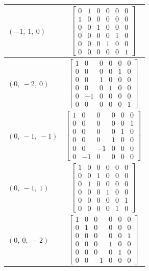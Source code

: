 \documentclass[11pt]{article}
\theoremstyle{definition}
\begin{document}
\begin{longtable}{|l|c|}
    \hline
    $\left( -1, \  1, \  0\right)$ & ${\left[\begin{matrix}0 & 1 & 0 & 0 & 0 & 0\\1 & 0 & 0 & 0 & 0 & 0\\0 & 0 & 1 & 0 & 0 & 0\\0 & 0 & 0 & 0 & 1 & 0\\0 & 0 & 0 & 1 & 0 & 0\\0 & 0 & 0 & 0 & 0 & 1\end{matrix}\right]}$ \\
    \hline
    $\left( 0, \  -2, \  0\right)$ & ${\left[\begin{matrix}1 & 0 & 0 & 0 & 0 & 0\\0 & 0 & 0 & 0 & 1 & 0\\0 & 0 & 1 & 0 & 0 & 0\\0 & 0 & 0 & 1 & 0 & 0\\0 & -1 & 0 & 0 & 0 & 0\\0 & 0 & 0 & 0 & 0 & 1\end{matrix}\right]}$ \\
    \hline
    $\left( 0, \  -1, \  -1\right)$ & ${\left[\begin{matrix}1 & 0 & 0 & 0 & 0 & 0\\0 & 0 & 0 & 0 & 0 & 1\\0 & 0 & 0 & 0 & 1 & 0\\0 & 0 & 0 & 1 & 0 & 0\\0 & 0 & -1 & 0 & 0 & 0\\0 & -1 & 0 & 0 & 0 & 0\end{matrix}\right]}$ \\
    \hline
    $\left( 0, \  -1, \  1\right)$ & ${\left[\begin{matrix}1 & 0 & 0 & 0 & 0 & 0\\0 & 0 & 1 & 0 & 0 & 0\\0 & 1 & 0 & 0 & 0 & 0\\0 & 0 & 0 & 1 & 0 & 0\\0 & 0 & 0 & 0 & 0 & 1\\0 & 0 & 0 & 0 & 1 & 0\end{matrix}\right]}$ \\
    \hline
    $\left( 0, \  0, \  -2\right)$ & ${\left[\begin{matrix}1 & 0 & 0 & 0 & 0 & 0\\0 & 1 & 0 & 0 & 0 & 0\\0 & 0 & 0 & 0 & 0 & 1\\0 & 0 & 0 & 1 & 0 & 0\\0 & 0 & 0 & 0 & 1 & 0\\0 & 0 & -1 & 0 & 0 & 0\end{matrix}\right]}$ \\

\end{longtable}
\end{document}
